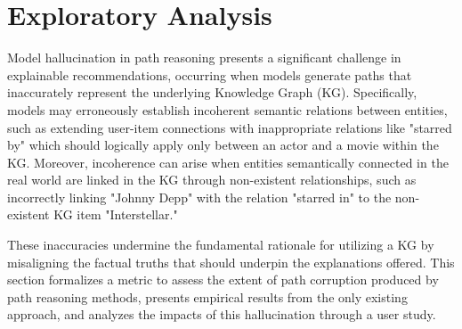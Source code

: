 \documentclass[sigconf]{acmart}
\begin{document}
\section{Exploratory Analysis}
\label{sec:model-hallucination}
Model hallucination in path reasoning presents a significant challenge in explainable recommendations, occurring when models generate paths that inaccurately represent the underlying Knowledge Graph (KG). Specifically, models may erroneously establish incoherent semantic relations between entities, such as extending user-item connections with inappropriate relations like "starred by" which should logically apply only between an actor and a movie within the KG. Moreover, incoherence can arise when entities semantically connected in the real world are linked in the KG through non-existent relationships, such as incorrectly linking "Johnny Depp" with the relation "starred in" to the non-existent KG item "Interstellar."

These inaccuracies undermine the fundamental rationale for utilizing a KG by misaligning the factual truths that should underpin the explanations offered. This section formalizes a metric to assess the extent of path corruption produced by path reasoning methods, presents empirical results from the only existing approach, and analyzes the impacts of this hallucination through a user study.
\end{document}
